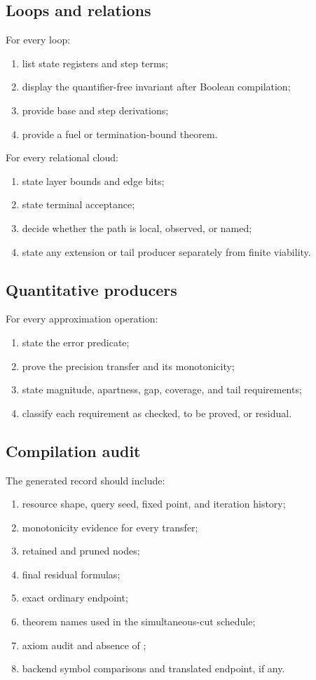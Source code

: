 \subsection{Loops and relations}

For every loop:
\begin{enumerate}
  \item list state registers and step terms;
  \item display the quantifier-free invariant after Boolean compilation;
  \item provide base and step derivations;
  \item provide a fuel or termination-bound theorem.
\end{enumerate}
For every relational cloud:
\begin{enumerate}
  \item state layer bounds and edge bits;
  \item state terminal acceptance;
  \item decide whether the path is local, observed, or named;
  \item state any extension or tail producer separately from finite viability.
\end{enumerate}

\subsection{Quantitative producers}

For every approximation operation:
\begin{enumerate}
  \item state the error predicate;
  \item prove the precision transfer and its monotonicity;
  \item state magnitude, apartness, gap, coverage, and tail requirements;
  \item classify each requirement as checked, to be proved, or residual.
\end{enumerate}

\subsection{Compilation audit}

The generated record should include:
\begin{enumerate}
  \item resource shape, query seed, fixed point, and iteration history;
  \item monotonicity evidence for every transfer;
  \item retained and pruned nodes;
  \item final residual formulas;
  \item exact ordinary endpoint;
  \item theorem names used in the simultaneous-cut schedule;
  \item axiom audit and absence of ;
  \item backend symbol comparisons and translated endpoint, if any.
\end{enumerate}

